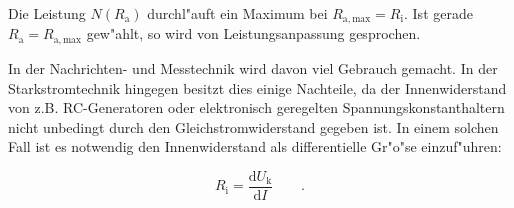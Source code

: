 Die Leistung $N(R_\mathrm{a})$ durchl"auft ein Maximum bei $R_\mathrm{a,max} = R_\mathrm{i}$.
Ist gerade $R_\mathrm{a} = R_\mathrm{a,max}$ gew"ahlt, so wird von Leistungsanpassung gesprochen.

In der Nachrichten- und Messtechnik wird davon viel Gebrauch gemacht.
In der Starkstromtechnik hingegen besitzt dies einige Nachteile, da der Innenwiderstand von z.B. RC-Generatoren oder elektronisch geregelten Spannungskonstanthaltern nicht unbedingt durch den Gleichstromwiderstand gegeben ist.
In einem solchen Fall ist es notwendig den Innenwiderstand als differentielle Gr"o"se einzuf"uhren:

\begin{equation}
	R_\mathrm{i} = \frac{\mathrm{d}U_\mathrm{k}}{\mathrm{d}I} \qquad .
\end{equation}